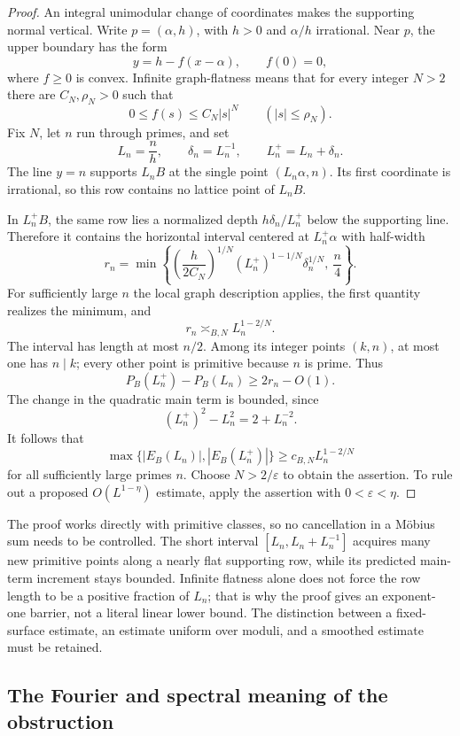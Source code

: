 \documentclass[11pt,a4paper]{article}
\numberwithin{equation}{section}
\theoremstyle{definition}
\theoremstyle{remark}
\begin{document}
\begin{proof}
An integral unimodular change of coordinates makes the supporting normal
vertical. Write $p=(\alpha,h)$, with $h>0$ and $\alpha/h$ irrational.
Near $p$, the upper boundary has the form
\[
 y=h-f(x-\alpha),\qquad f(0)=0,
\]
where $f\geq0$ is convex. Infinite graph-flatness means that for every
integer $N>2$ there are $C_N,\rho_N>0$ such that
\[
 0\leq f(s)\leq C_N|s|^N\qquad (|s|\leq\rho_N).
\]
Fix $N$, let $n$ run through primes, and set
\[
 L_n=\frac nh,\qquad \delta_n=L_n^{-1},\qquad L_n^+=L_n+\delta_n.
\]
The line $y=n$ supports $L_nB$ at the single point
$(L_n\alpha,n)$. Its first coordinate is irrational, so this row
contains no lattice point of $L_nB$.

In $L_n^+B$, the same row lies a normalized depth
$h\delta_n/L_n^+$ below the supporting line. Therefore it contains the
horizontal interval centered at $L_n^+\alpha$ with half-width
\[
 r_n=\min\left\{
 \left(\frac h{2C_N}\right)^{1/N}
 (L_n^+)^{1-1/N}\delta_n^{1/N},\ \frac n4
 \right\}.
\]
For sufficiently large $n$ the local graph description applies, the
first quantity realizes the minimum, and
\[
 r_n\asymp_{B,N}L_n^{1-2/N}.
\]
The interval has length at most $n/2$. Among its integer points
$(k,n)$, at most one has $n\mid k$; every other point is primitive
because $n$ is prime. Thus
\[
 P_B(L_n^+)-P_B(L_n)\geq 2r_n-O(1).
\]
The change in the quadratic main term is bounded, since
\[
 (L_n^+)^2-L_n^2=2+L_n^{-2}.
\]
It follows that
\[
 \max\{|E_B(L_n)|,|E_B(L_n^+)|\}
 \geq c_{B,N}L_n^{1-2/N}
\]
for all sufficiently large primes $n$. Choose $N>2/\varepsilon$ to
obtain the assertion. To rule out a proposed $O(L^{1-\eta})$ estimate,
apply the assertion with $0<\varepsilon<\eta$.
\end{proof}

The proof works directly with primitive classes, so no cancellation in a
M\"obius sum needs to be controlled. The short interval
$[L_n,L_n+L_n^{-1}]$ acquires many new primitive points along a nearly
flat supporting row, while its predicted main-term increment stays
bounded. Infinite flatness alone does not force the row length to be a
positive fraction of $L_n$; that is why the proof gives an exponent-one
barrier, not a literal linear lower bound. The distinction between a
fixed-surface estimate, an estimate uniform over moduli, and a smoothed
estimate must be retained.

\subsection{The Fourier and spectral meaning of the obstruction}
\label{subsec:normballspectral}
\end{document}
